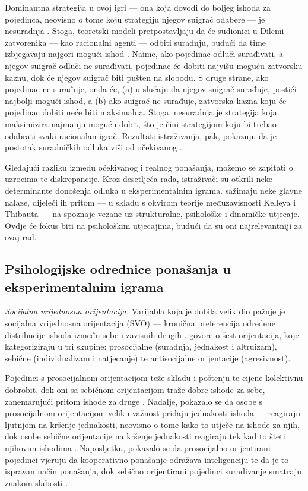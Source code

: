 \documentclass[a4paper, 12pt]{report}
\begin{document}
Dominantna strategija u ovoj igri --- ona koja dovodi do boljeg ishoda za
pojedinca, neovisno o tome koju strategiju njegov suigrač odabere --- je
nesuradnja \citep{colgt}. Stoga, teoretski modeli pretpostavljaju da će sudionici u
Dilemi zatvorenika --- kao racionalni agenti --- odbiti suradnju, budući da time
izbjegavaju najgori mogući ishod \citep{worldexgame}. Naime, ako pojedinac
odluči surađivati, a njegov suigrač odluči ne surađivati, pojedinac će dobiti
najvišu moguću zatvorsku kaznu, dok će njegov suigrač biti pušten na slobodu. S
druge strane, ako pojedinac ne surađuje, onda će, (a) u slučaju da njegov suigrač
surađuje, postići najbolji mogući ishod, a (b) ako suigrač ne surađuje, zatvorska
kazna koju će pojedinac dobiti neće biti maksimalna. Stoga, nesuradnja je
strategija koja maksimizira najmanju moguću dobit, što je čini strategijom koju
bi trebao odabrati svaki racionalan igrač. 
Rezultati istraživanja,
pak, pokazuju da je postotak suradničkih odluka viši od očekivanog \citep{colgt,
    worldexgame, jones2008smarter, shafir1992thinking}.

Gledajući razliku između očekivanog i realnog ponašanja, možemo se zapitati o
uzrocima te diskrepancije. Kroz desetljeća rada, istraživači su otkrili neke
determinante donošenja odluka u eksperimentalnim igrama. 
 sažimaju neke glavne nalaze, dijeleći ih pritom --- u skladu
s  okvirom teorije međuzavisnosti Kelleya i Thibauta \citeyearpar{kelthibinterp} --- na
spoznaje vezane uz strukturalne, psihološke i dinamičke utjecaje.
Ovdje će fokus biti na psihološkim utjecajima, budući da su oni
najrelevantniji za ovaj rad.

\subsection{Psihologijske odrednice ponašanja u eksperimentalnim igrama}

\textit{Socijalna vrijednosna orijentacija.} Varijabla koja je dobila velik
dio pažnje je socijalna vrijednosna orijentacija (SVO)
\citep{messicksov,vanpursuit} --- kronična preferencija određene distribucije
ishoda između sebe i zavisnih drugih \citep{handdedreu}. \citet{krugsochand}
govore o šest orijentacija, koje
kategoriziraju u tri skupine: prosocijalne  (suradnja, jednakost i
altruizam), sebične (individualizam i
natjecanje) te antisocijalne orijentacije (agresivnost). 

Pojedinci s prosocijalnom orijentacijom teže skladu i poštenju te cijene
kolektivnu dobrobit, dok oni sa sebičnom orijentacijom traže dobre ishode za
sebe, zanemarujući pritom ishode za druge \citep{handdedreu}. Nadalje,
pokazalo se da osobe s prosocijalnom orijentacijom veliku važnost pridaju
jednakosti ishoda --- reagiraju ljutnjom na kršenje jednakosti, neovisno o tome
kako to utječe na ishode za njih, dok osobe sebične orijentacije na kršenje
jednakosti reagiraju tek kad to šteti njihovim ishodima \citep{vancoop}.
Naposljetku, pokazalo se da prosocijalno orijentirani pojedinci vjeruju da
kooperativno ponašanje odražava inteligenciju te da je to ispravan način
ponašanja, dok sebično orijentirani pojedinci surađivanje smatraju znakom
slabosti
\citep*{liebrand1986might,mcclintock1988role,langelieb91,van1990causal}.
\end{document}

